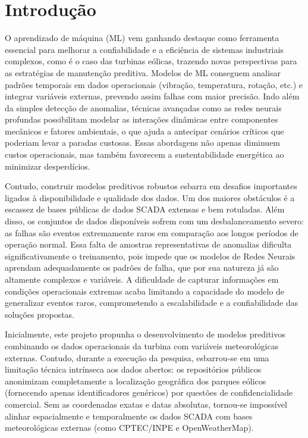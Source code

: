 \documentclass[12pt]{article}
\begin{document}
\pagestyle{abnt}

\section{Introdução}

O aprendizado de máquina (ML) vem ganhando destaque como ferramenta essencial para melhorar a confiabilidade e a eficiência de sistemas industriais complexos, como é o caso das turbinas eólicas, trazendo novas perspectivas para as estratégias de manutenção preditiva. Modelos de ML conseguem analisar padrões temporais em dados operacionais (vibração, temperatura, rotação, etc.) e integrar variáveis externas, prevendo assim falhas com maior precisão. Indo além da simples detecção de anomalias, técnicas avançadas como as redes neurais profundas possibilitam modelar as interações dinâmicas entre componentes mecânicos e fatores ambientais, o que ajuda a antecipar cenários críticos que poderiam levar a paradas custosas. Essas abordagens não apenas diminuem custos operacionais, mas também favorecem a sustentabilidade energética ao minimizar desperdícios.  

Contudo, construir modelos preditivos robustos esbarra em desafios importantes ligados à disponibilidade e qualidade dos dados. Um dos maiores obstáculos é a escassez de bases públicas de dados SCADA extensas e bem rotuladas. Além disso, os conjuntos de dados disponíveis sofrem com um desbalanceamento severo: as falhas são eventos extremamente raros em comparação aos longos períodos de operação normal. Essa falta de amostras representativas de anomalias dificulta significativamente o treinamento, pois impede que os modelos de Redes Neurais aprendam adequadamente os padrões de falha, que por sua natureza já são altamente complexos e variáveis. A dificuldade de capturar informações em condições operacionais extremas acaba limitando a capacidade do modelo de generalizar eventos raros, comprometendo a escalabilidade e a confiabilidade das soluções propostas.  

Inicialmente, este projeto propunha o desenvolvimento de modelos preditivos combinando os dados operacionais da turbina com variáveis meteorológicas externas. Contudo, durante a execução da pesquisa, esbarrou-se em uma limitação técnica intrínseca aos dados abertos: os repositórios públicos anonimizam completamente a localização geográfica dos parques eólicos (fornecendo apenas identificadores genéricos) por questões de confidencialidade comercial. Sem as coordenadas exatas e datas absolutas, tornou-se impossível alinhar espacialmente e temporalmente os dados SCADA com bases meteorológicas externas (como CPTEC/INPE e OpenWeatherMap).  
\end{document}
